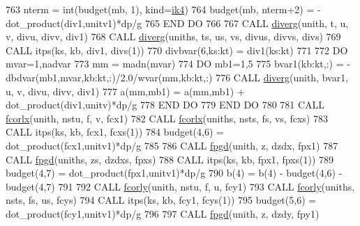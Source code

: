 \begin{DoxyCode}
763     nterm               = int(budget(mb, 1), kind=\hyperlink{namespaceportable_aa110cf333432508140602ea192c4b2ea}{ik4})
764     budget(mb, nterm+2) = -dot\_product(div1,unitv1)*dp/\hyperlink{namespaceconstants_a046aef138fbc8d05251d4fdc6eb3ee89}{g}
765 \textcolor{keywordflow}{END DO}
766 
767 \textcolor{keyword}{CALL }\hyperlink{namespacephysics_adc35216d512f6586071a79fba286a39c}{diverg}(unith, t, u, v, divu, divv, div1)
768 \textcolor{keyword}{CALL }\hyperlink{namespacephysics_adc35216d512f6586071a79fba286a39c}{diverg}(uniths, ts, us, vs, divus, divvs, divs)
769 \textcolor{keyword}{CALL }itps(ks, kb, div1, divs(1))
770 divbvar(6,ks:kt)        = div1(ks:kt)
771 
772 \textcolor{keywordflow}{DO} mvar=1,nadvar
773     mm  = madn(mvar)
774     \textcolor{keywordflow}{DO} mb1=1,5
775         bvar1(kb:kt,:)  = -dbdvar(mb1,mvar,kb:kt,:)/2.0/wvar(mm,kb:kt,:)
776         \textcolor{keyword}{CALL }\hyperlink{namespacephysics_adc35216d512f6586071a79fba286a39c}{diverg}(unith, bvar1, u, v, divu, divv, div1)
777         a(mm,mb1)       = a(mm,mb1) + dot\_product(div1,unitv)*dp/\hyperlink{namespaceconstants_a046aef138fbc8d05251d4fdc6eb3ee89}{g}
778 \textcolor{keywordflow}{    END DO}
779 \textcolor{keywordflow}{END DO}
780 
781 \textcolor{keyword}{CALL }\hyperlink{namespacephysics_a56a179b5bd2c13a2201b2367037a42cf}{fcorlx}(unith, nstu, f, v, fcx1)
782 \textcolor{keyword}{CALL }\hyperlink{namespacephysics_a56a179b5bd2c13a2201b2367037a42cf}{fcorlx}(uniths, nsts, fs, vs, fcxs)
783 \textcolor{keyword}{CALL }itps(ks, kb, fcx1, fcxs(1))
784 budget(4,6)     = dot\_product(fcx1,unitv1)*dp/\hyperlink{namespaceconstants_a046aef138fbc8d05251d4fdc6eb3ee89}{g}
785 
786 \textcolor{keyword}{CALL }\hyperlink{namespacephysics_acf841366af6f4fd7502b4031a2cacb56}{fpgd}(unith, z, dzdx, fpx1)
787 \textcolor{keyword}{CALL }\hyperlink{namespacephysics_acf841366af6f4fd7502b4031a2cacb56}{fpgd}(uniths, zs, dzdxs, fpxs)
788 \textcolor{keyword}{CALL }itps(ks, kb, fpx1, fpxs(1))
789 budget(4,7)     = dot\_product(fpx1,unitv1)*dp/\hyperlink{namespaceconstants_a046aef138fbc8d05251d4fdc6eb3ee89}{g}
790 b(4)            = b(4) - budget(4,6) - budget(4,7)
791 
792 \textcolor{keyword}{CALL }\hyperlink{namespacephysics_a1f64bd544ea55c7fbbf5330725fc0896}{fcorly}(unith, nstu, f, u, fcy1)
793 \textcolor{keyword}{CALL }\hyperlink{namespacephysics_a1f64bd544ea55c7fbbf5330725fc0896}{fcorly}(uniths, nsts, fs, us, fcys)
794 \textcolor{keyword}{CALL }itps(ks, kb, fcy1, fcys(1))
795 budget(5,6)     = dot\_product(fcy1,unitv1)*dp/\hyperlink{namespaceconstants_a046aef138fbc8d05251d4fdc6eb3ee89}{g}
796 
797 \textcolor{keyword}{CALL }\hyperlink{namespacephysics_acf841366af6f4fd7502b4031a2cacb56}{fpgd}(unith, z, dzdy, fpy1)

\end{DoxyCode}
